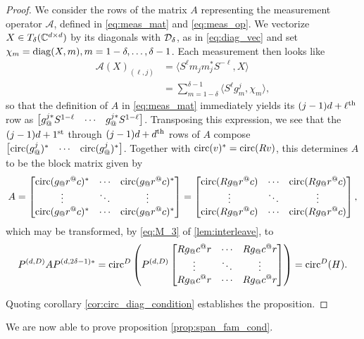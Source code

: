 \begin{proof}
  We consider the rows of the matrix $A$ representing the measurement operator $\mathcal{A}$, defined in \eqref{eq:meas_mat} and \eqref{eq:meas_op}.  We vectorize $X \in T_\delta(\mathbb{C}^{d \times d})$ by its diagonals with $\mathcal{D}_\delta$, as in \eqref{eq:diag_vec} and set $\chi_m = \operatorname{diag}(X, m), m = 1 - \delta, \ldots, \delta - 1$.  Each measurement then looks like
  \begin{align*}
    \mathcal{A}(X)_{(\ell, j)} &= \langle S^{\ell} m_j m_j^* S^{-\ell}, X \rangle \\
    &= \sum_{m = 1 - \delta}^{\delta - 1} \langle S^{\ell} g_m^j, \chi_m \rangle,
  \end{align*}
  so that the definition of $A$ in \eqref{eq:meas_mat} immediately yields its $(j - 1) d + \ell^{\text{th}}$ row as $\rowmatfun{g_@^{j*} S^{1 - \ell}}{1 - \delta}{\delta - 1}$.  Transposing this expression, we see that the $(j - 1)d + 1^{\text{st}}$ through $(j - 1) d + d^{\text{th}}$ rows of $A$ compose $\rowmatfun{\circop(g^j_@)^*}{1 - \delta}{\delta - 1}$. %
  Together with $\operatorname{circ}(v)^* = \operatorname{circ}(Rv)$, this determines $A$ to be the block matrix given by \[A = \cornmatfun{\circop(g_@r^@c)^*}{1}{D}{1 - \delta}{\delta - 1} = \cornmatfun{\circop(R g_@r^@c)}{1}{D}{1 - \delta}{\delta - 1},\] which may be transformed, by \eqref{eq:M_3} of \cref{lem:interleave}, to \begin{equation}P^{(d, D)} A P^{(d, 2 \delta - 1)*} = \circop^D\left(P^{(d, D)} \cornmatfun{R g_@c^@r}{1}{D}{1 - \delta}{\delta - 1} \right) = \circop^D(H). \label{eq:interleaved_meas}\end{equation}

Quoting corollary \ref{cor:circ_diag_condition} establishes the proposition.
\end{proof}

We are now able to prove proposition \ref{prop:span_fam_cond}.

